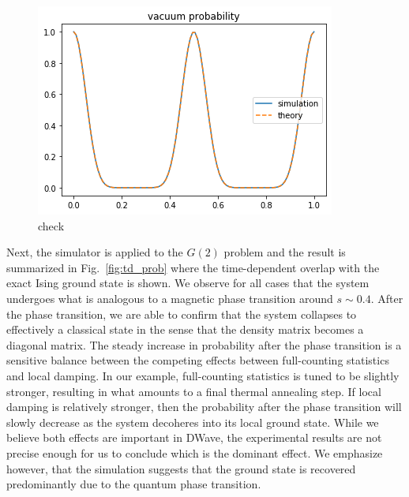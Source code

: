 \documentclass[prd,twocolumn,tightenlines,preprintnumbers,showpacs,superscriptaddress,notitlepage,nofootinbib,eqsecnum,floatfix,longbibliography,aps,10pt]{revtex4-2}
\begin{document}
\begin{figure}
	\centering
	\includegraphics[width=\columnwidth]{./figures/check.png}
	\caption{check}
	\label{fig:check}
\end{figure}

Next, the simulator is applied to the $G(2)$ problem and the result is summarized in Fig.~\ref{fig:td_prob} where the time-dependent overlap with the exact Ising ground state is shown. We observe for all cases that the system undergoes what is analogous to a magnetic phase transition around $s\sim 0.4$.
After the phase transition, we are able to confirm that the system collapses to effectively a classical state in the sense that the density matrix becomes a diagonal matrix.
The steady increase in probability after the phase transition is a sensitive balance between the competing effects between full-counting statistics and local damping.
In our example, full-counting statistics is tuned to be slightly stronger, resulting in what amounts to a final thermal annealing step.
If local damping is relatively stronger, then the probability after the phase transition will slowly decrease as the system decoheres into its local ground state.
While we believe both effects are important in DWave, the experimental results are not precise enough for us to conclude which is the dominant effect.
We emphasize however, that the simulation suggests that the ground state is recovered predominantly due to the quantum phase transition.
\end{document}
